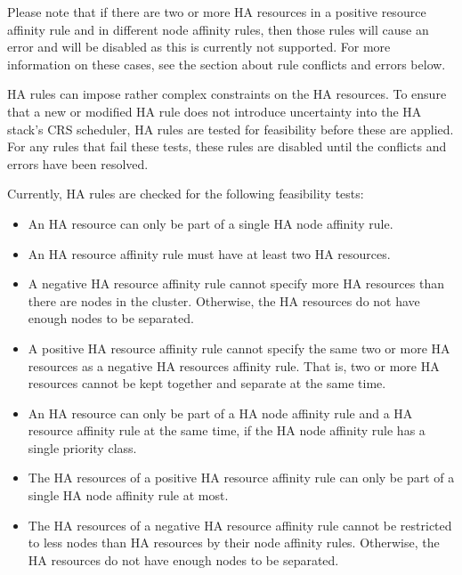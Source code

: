 Please note that if there are two or more HA resources in a positive resource affinity rule and in different node affinity rules, then those rules will cause an error and will be disabled as this is currently not supported. For more information on these cases, see the section about rule conflicts and errors below.

HA rules can impose rather complex constraints on the HA resources. To ensure that a new or modified HA rule does not introduce uncertainty into the HA stack’s CRS scheduler, HA rules are tested for feasibility before these are applied. For any rules that fail these tests, these rules are disabled until the conflicts and errors have been resolved.

Currently, HA rules are checked for the following feasibility tests:

\begin{itemize}[leftmargin=2cm]

	\item An HA resource can only be part of a single HA node affinity rule.

	\item An HA resource affinity rule must have at least two HA resources.

	\item A negative HA resource affinity rule cannot specify more HA resources than there are nodes in the cluster. Otherwise, the HA resources do not have enough nodes to be separated.

	\item A positive HA resource affinity rule cannot specify the same two or more HA resources as a negative HA resources affinity rule. That is, two or more HA resources cannot be kept together and separate at the same time.

	\item An HA resource can only be part of a HA node affinity rule and a HA resource affinity rule at the same time, if the HA node affinity rule has a single priority class.

	\item The HA resources of a positive HA resource affinity rule can only be part of a single HA node affinity rule at most.

	\item The HA resources of a negative HA resource affinity rule cannot be restricted to less nodes than HA resources by their node affinity rules. Otherwise, the HA resources do not have enough nodes to be separated.

\end{itemize}

